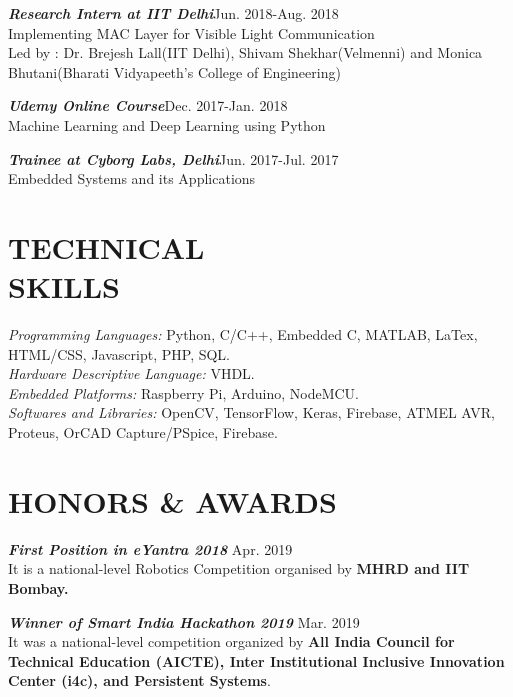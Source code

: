 \documentclass[margin, 10pt]{res} %
\begin{document}
\begin{resume}
{\sl \bf{Research Intern at IIT Delhi}}\hfill Jun. 2018-Aug. 2018\\
Implementing MAC Layer for Visible Light Communication \\
Led by : Dr. Brejesh Lall(IIT Delhi), Shivam Shekhar(Velmenni) and Monica Bhutani(Bharati Vidyapeeth's College of Engineering)

{\sl \bf{Udemy Online Course}}\hfill Dec. 2017-Jan. 2018\\
Machine Learning and Deep Learning using Python


{\sl \bf{Trainee at Cyborg Labs, Delhi}}\hfill Jun. 2017-Jul. 2017\\
Embedded Systems and its Applications

\section{TECHNICAL \\ SKILLS} 

{\sl Programming Languages:} Python, C/C++, Embedded C, MATLAB, LaTex, HTML/CSS, Javascript, PHP, SQL.  \\
{\sl Hardware Descriptive Language:} VHDL. \\
{\sl Embedded Platforms:} Raspberry Pi, Arduino, NodeMCU. \\
{\sl Softwares and Libraries:} OpenCV, TensorFlow, Keras, Firebase, ATMEL AVR, Proteus, OrCAD Capture/PSpice, Firebase. 



\section{HONORS \& AWARDS}


{\sl \bf{First Position in eYantra 2018} } \hfill Apr. 2019\\It is a national-level Robotics Competition organised by \bf{MHRD} and \bf{IIT Bombay}.

{\sl \bf{Winner of Smart India Hackathon 2019} } \hfill {\normalfont Mar. 2019\\It was a national-level competition organized by \bf{All India Council for Technical Education (AICTE), Inter Institutional Inclusive Innovation Center (i4c),} and \bf{Persistent Systems}}.


\end{resume}
\end{document}
